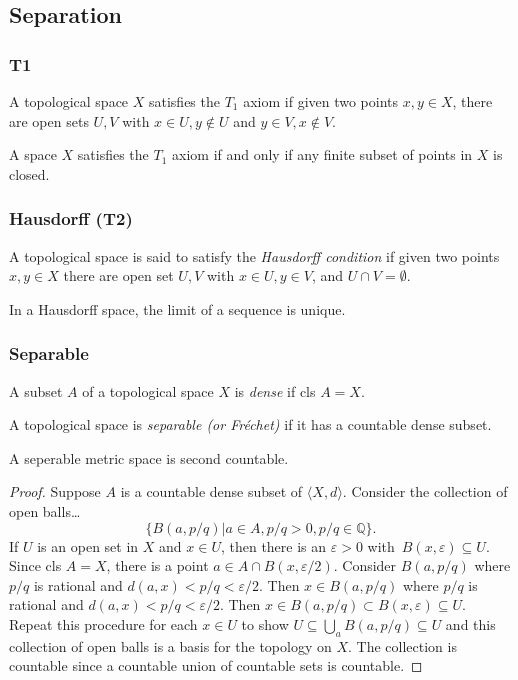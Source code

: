 \subsection{Separation}\label{separation}

\subsubsection{T1}\label{t1}
A topological space $X$ satisfies the $T_1$ axiom if given two points $x,y \in X$, there are open sets
$U,V$ with $x \in U, y \not\in U$ and $y \in V, x \not\in V$.

\begin{proposition}
A space $X$ satisfies the $T_1$ axiom if and only if any finite subset of points in $X$ is closed.
\end{proposition}

\subsubsection{Hausdorff (T2)}\label{t2}
A topological space is said to satisfy the \emph{Hausdorff condition} if given two points $x,y \in X$ there
are open set $U,V$ with $x \in U, y \in V$, and $U \cap V = \emptyset$.

\begin{theorem}
In a Hausdorff space, the limit of a sequence is unique.
\end{theorem}

\subsubsection{Separable}\label{separable}
\label{dense}
A subset $A$ of a topological space $X$ is \emph{dense} if cls $A = X$.

\label{definition}
A topological space is \emph{separable (or Fr\'echet)} if it has a countable dense subset.

\begin{theorem}
A seperable metric space is second countable.
\end{theorem}

\begin{proof}
Suppose $A$ is a countable dense subset of $\langle X, d \rangle$. Consider the collection of open balls\dots
$$\{B(a,p/q) | a \in A, p/q > 0, p/q \in \mathbb{Q} \}.$$
If $U$ is an open set in $X$ and $x \in U$, then there is an $\varepsilon > 0$ with\ $B(x, \varepsilon) \subseteq U$.
Since cls $A = X$, there is a point $a \in A \cap B(x, \varepsilon / 2).$ Consider $B(a, p/q)$ where $p/q$ is rational
and $d(a,x) < p/q < \varepsilon / 2.$ Then $x \in B(a, p/q)$ where $p/q$ is rational and $d(a,x) < p/q < \varepsilon/2$.
Then $x \in B(a,p/q) \subset B(x,\varepsilon) \subseteq U$. Repeat this procedure for each $x \in U$ to show $U \subseteq \bigcup_{a}B(a,p/q) \subseteq U$
and this collection of open balls is a basis for the topology on $X$. The collection is countable since a countable union of countable sets is countable.
\end{proof}